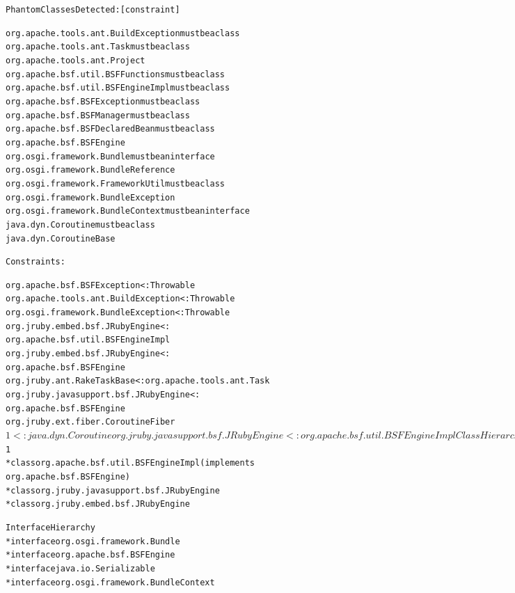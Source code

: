 \begin{alltt}\footnotesize
Phantom Classes Detected: \hfill{[constraint]}

org.apache.tools.ant.BuildException \hfill{must be a class}
org.apache.tools.ant.Task \hfill{must be a class}
org.apache.tools.ant.Project
org.apache.bsf.util.BSFFunctions \hfill{must be a class}
org.apache.bsf.util.BSFEngineImpl \hfill{must be a class}
org.apache.bsf.BSFException \hfill{must be a class}
org.apache.bsf.BSFManager \hfill{must be a class}
org.apache.bsf.BSFDeclaredBean \hfill{must be a class}
org.apache.bsf.BSFEngine
org.osgi.framework.Bundle \hfill{must be an interface}
org.osgi.framework.BundleReference
org.osgi.framework.FrameworkUtil \hfill{must be a class}
org.osgi.framework.BundleException
org.osgi.framework.BundleContext \hfill{must be an interface}
java.dyn.Coroutine \hfill{must be a class}
java.dyn.CoroutineBase

Constraints:

org.apache.bsf.BSFException <: Throwable
org.apache.tools.ant.BuildException <: Throwable
org.osgi.framework.BundleException <: Throwable
org.jruby.embed.bsf.JRubyEngine <:
  org.apache.bsf.util.BSFEngineImpl
org.jruby.embed.bsf.JRubyEngine <:
  org.apache.bsf.BSFEngine
org.jruby.ant.RakeTaskBase <: org.apache.tools.ant.Task
org.jruby.javasupport.bsf.JRubyEngine <:
  org.apache.bsf.BSFEngine
org.jruby.ext.fiber.CoroutineFiber$1 <:
  java.dyn.Coroutine
org.jruby.javasupport.bsf.JRubyEngine <:
  org.apache.bsf.util.BSFEngineImpl

Class Hierarchy
* class java.lang.Object
  * class org.apache.bsf.BSFManager
  * class org.osgi.framework.FrameworkUtil
  * class Throwable (implements java.io.Serializable)
    * class org.osgi.framework.BundleException
    * class org.apache.tools.ant.BuildException
    * class org.apache.bsf.BSFException
  * class org.apache.bsf.BSFDeclaredBean
  * class org.apache.bsf.util.BSFFunctions
  * class org.apache.tools.ant.Task
    * class org.jruby.ant.RakeTaskBase
  * class java.dyn.Coroutine
    * class org.jruby.ext.fiber.CoroutineFiber$1
  * class org.apache.bsf.util.BSFEngineImpl (implements
     org.apache.bsf.BSFEngine)
    * class org.jruby.javasupport.bsf.JRubyEngine
    * class org.jruby.embed.bsf.JRubyEngine

Interface Hierarchy
* interface org.osgi.framework.Bundle
* interface org.apache.bsf.BSFEngine
* interface java.io.Serializable
* interface org.osgi.framework.BundleContext
\end{alltt}

